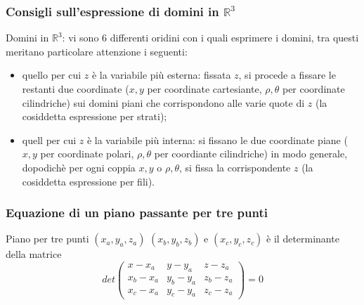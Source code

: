 \subsubsection{Consigli sull'espressione di domini in $\mathbb{R}^3$}
Domini in $\mathbb{R}^3$: vi sono 6 differenti oridini con i quali esprimere i domini, tra questi meritano particolare attenzione i seguenti:
\begin{itemize}
    \item quello per cui $z$ è la variabile più esterna: fissata $z$, si procede a fissare le restanti due coordinate ($x,y$ per coordinate cartesiante, $\rho, \theta$ per coordinate cilindriche) sui domini piani che corrispondono alle varie quote di $z$ (la cosiddetta espressione per strati);
    \item quell per cui $z$ è la variabile più interna: si fissano le due coordinate piane ($x,y$ per coordinate polari, $\rho, \theta$ per coordiante cilindriche) in modo generale, dopodichè per ogni coppia $x,y$ o $\rho, \theta$, si fissa la corrispondente $z$ (la cosiddetta espressione per fili).
\end{itemize}
\subsubsection{Equazione di un piano passante per tre punti}
Piano per tre punti $(x_a, y_a, z_a)$ $(x_b, y_b, z_b)$ e $(x_c, y_c, z_c)$ è il determinante della matrice 
\[
    det\left(\begin{matrix}
        x-x_a & y-y_a & z-z_a\\
        x_b-x_a & y_b-y_a & z_b-z_a\\
        x_c-x_a & y_c - y_a & z_c -z_a 
    \end{matrix}\right) = 0
\]